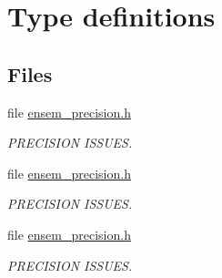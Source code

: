 \hypertarget{group__defs}{}\section{Type definitions}
\label{group__defs}
\subsection*{Files}
\begin{DoxyCompactItemize}
\item 
file \mbox{\hyperlink{adat-devel_2lib_2ensem_2ensem__precision_8h}{ensem\+\_\+precision.\+h}}
\begin{DoxyCompactList}\small\item\em P\+R\+E\+C\+I\+S\+I\+ON I\+S\+S\+U\+ES. \end{DoxyCompactList}\item 
file \mbox{\hyperlink{adat__devel_2lib_2ensem_2ensem__precision_8h}{ensem\+\_\+precision.\+h}}
\begin{DoxyCompactList}\small\item\em P\+R\+E\+C\+I\+S\+I\+ON I\+S\+S\+U\+ES. \end{DoxyCompactList}\item 
file \mbox{\hyperlink{adat__devel__install_2include_2ensem_2ensem__precision_8h}{ensem\+\_\+precision.\+h}}
\begin{DoxyCompactList}\small\item\em P\+R\+E\+C\+I\+S\+I\+ON I\+S\+S\+U\+ES. \end{DoxyCompactList}\end{DoxyCompactItemize}
